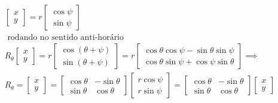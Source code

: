 \documentclass{beamer}
\begin{document}
\begin{frame}
  \begin{gather*}
    \begin{bmatrix}
      x \\ y 
    \end{bmatrix} = r\begin{bmatrix}
      \cos\psi \\ \sin\psi
    \end{bmatrix} \\
    \text{ rodando no sentido anti-horário } \\
    R_{\theta}\begin{bmatrix}
      x \\ y
    \end{bmatrix} = r\begin{bmatrix}
      \cos(\theta + \psi) \\ \sin(\theta + \psi) 
    \end{bmatrix}= r\begin{bmatrix}
      \cos\theta \cos\psi - \sin\theta \sin\psi \\
      \cos\theta\sin\psi + \cos\psi\sin\theta
    \end{bmatrix} \implies \\
    R_{\theta}=
    \begin{bmatrix}
      x \\ y
    \end{bmatrix}=\begin{bmatrix}
      \cos\theta & -\sin\theta \\
      \sin\theta & \cos\theta 
    \end{bmatrix} \begin{bmatrix}
      r\cos\psi \\ r\sin\psi
    \end{bmatrix} =\begin{bmatrix}
      \cos\theta & -\sin\theta \\
      \sin\theta & \cos\theta 
    \end{bmatrix}\begin{bmatrix}
      x \\ y
    \end{bmatrix} 
  \end{gather*}

\end{frame}
\end{document}

